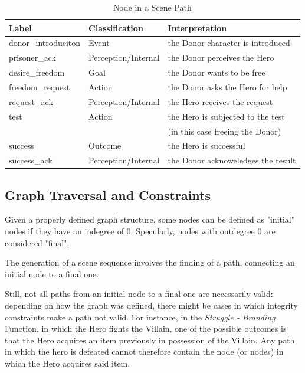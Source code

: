 \documentclass[12pt,a4paper,oneside]{report}
\begin{document}
\begin{table}[H]
\caption{Node in a Scene Path}
\label{tab:scenewalk}
\bigskip
\begin{tabular}{| l | l | l |}

\hline
Label & Classification & Interpretation \\
\hline
donor\_introduciton & Event & the Donor character is introduced \\
prisoner\_ack & Perception/Internal & the Donor perceives the Hero \\
desire\_freedom & Goal & the Donor wants to be free \\
freedom\_request & Action & the Donor asks the Hero for help \\
request\_ack & Perception/Internal & the Hero receives the request \\
test & Action & the Hero is subjected to the test \\
 &  & (in this case freeing the Donor) \\
success & Outcome & the Hero is successful \\
success\_ack & Perception/Internal & the Donor acknoweledges the result\\
\hline

\end{tabular}
\end{table}

\bigskip

\subsection{Graph Traversal and Constraints}
Given a properly defined graph structure, some nodes can be defined as "initial" nodes if they have an indegree of 0. Specularly, nodes with outdegree 0 are considered "final". 

The generation of a scene sequence involves the finding of a path, connecting an initial node to a final one.

Still, not all paths from an initial node to a final one are necessarily valid: depending on how the graph was defined, there might be cases in which integrity constraints make a path not valid. For instance, in the \textit{Struggle - Branding} Function, in which the Hero fights the Villain, one of the possible outcomes is that the Hero acquires an item previously in possession of the Villain. Any path in which the hero is defeated cannot therefore contain the node (or nodes) in which the Hero acquires said item.
\end{document}

